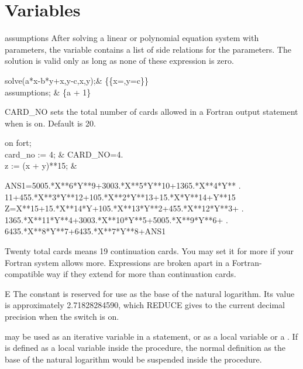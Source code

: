 \section{Variables}

\begin{Variable}{assumptions}
After solving a linear or polynomial equation system
with parameters, the variable  contains a list 
of side relations for the parameters. The solution is valid only
as long as none of these expression is zero.
\begin{Examples}
solve({a*x-b*y+x,y-c},{x,y});&
\{\{x=,y=c\}\} \\
assumptions; & \{a + 1\}
\end{Examples}
\end{Variable}


\begin{Variable}{CARD_NO}
 sets the total number of cards allowed in a Fortran
output statement when  is on.  Default is 20.

\begin{Examples}
on fort; \\
card_no := 4;                &         CARD_NO=4. \\
z := (x + y)**15;            &
\begin{multilineoutput}{6cm}
      ANS1=5005.*X**6*Y**9+3003.*X**5*Y**10+1365.*X**4*Y**
     . 11+455.*X**3*Y**12+105.*X**2*Y**13+15.*X*Y**14+Y**15
      Z=X**15+15.*X**14*Y+105.*X**13*Y**2+455.*X**12*Y**3+ 
     . 1365.*X**11*Y**4+3003.*X**10*Y**5+5005.*X**9*Y**6+
     . 6435.*X**8*Y**7+6435.*X**7*Y**8+ANS1
\end{multilineoutput}
\end{Examples}

\begin{Comments}
Twenty total cards means 19 continuation cards.  You may set it for more
if your Fortran system allows more.  Expressions are broken apart in a
Fortran-compatible way if they extend for more than 
continuation cards.
\end{Comments}
\end{Variable}


\begin{Constant}{E}
The constant  is reserved for use as the base of the natural
logarithm.  Its value is approximately 2.71828284590, which REDUCE gives
to the current decimal precision when the switch  is on.

\begin{Comments}
 may be used as an iterative variable in a  statement,
or as a local variable or a .  If  is defined
as a local
variable inside the procedure, the normal definition as the base of the
natural logarithm would be suspended inside the procedure.
\end{Comments}
\end{Constant}


